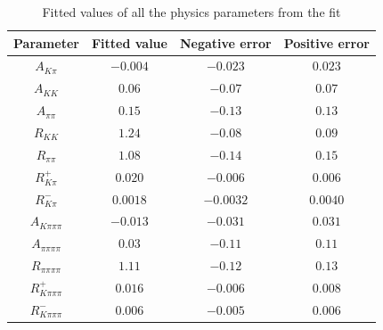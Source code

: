 \begin{table}[h]
\centering
{\footnotesize
\begin{tabular}{cccc}
Parameter & Fitted value & Negative error & Positive error \\
\hline
$A_{K\pi}$ & $-0.004$ & $-0.023$ & $0.023$ \\
$A_{KK}$ & $0.06$ & $-0.07$ & $0.07$ \\
$A_{\pi\pi}$ & $0.15$ & $-0.13$ & $0.13$ \\
$R_{KK}$ & $1.24$ & $-0.08$ & $0.09$ \\
$R_{\pi\pi}$ & $1.08$ & $-0.14$ & $0.15$ \\
$R^+_{K\pi}$ & $0.020$ & $-0.006$ & $0.006$ \\
$R^-_{K\pi}$ & $0.0018$ & $-0.0032$ & $0.0040$ \\
$A_{K\pi\pi\pi}$ & $-0.013$ & $-0.031$ & $0.031$ \\
$A_{\pi\pi\pi\pi}$ & $0.03$ & $-0.11$ & $0.11$ \\
$R_{\pi\pi\pi\pi}$ & $1.11$ & $-0.12$ & $0.13$ \\
$R^+_{K\pi\pi\pi}$ & $0.016$ & $-0.006$ & $0.008$ \\
$R^-_{K\pi\pi\pi}$ & $0.006$ & $-0.005$ & $0.006$ \\
\end{tabular}}
\caption{Fitted values of all the physics parameters from the \CP fit}
\label{cpfitresultsphysics}
\end{table}

